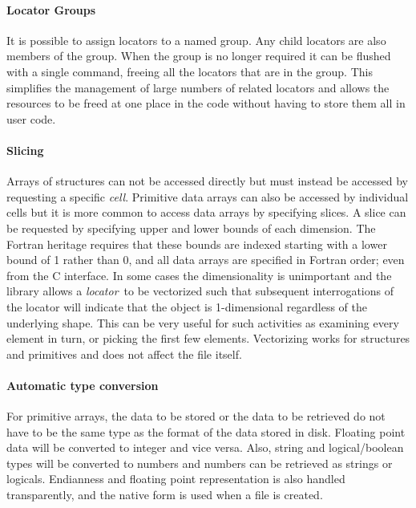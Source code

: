 \documentclass[final,authoryear,5p,times,twocolumn]{elsarticle}
\newcommand{\locator}{\emph{locator}}
\begin{document}
\paragraph{Locator Groups}

It is possible to assign locators to a named group. Any child locators
are also members of the group. When the group is no longer required it
can be flushed with a single command, freeing all the locators that
are in the group. This simplifies the management of large numbers
of related locators and allows the resources to be freed at one place
in the code without having to store them all in user code.

\paragraph{Slicing}

Arrays of structures can not be accessed directly but must instead be
accessed by requesting a specific \emph{cell}. Primitive data arrays
can also be accessed by individual cells but it is more common to
access data arrays by specifying slices. A slice can be requested by
specifying upper and lower bounds of each dimension. The Fortran
heritage requires that these bounds are indexed starting with a lower
bound of 1 rather than 0, and all data arrays are specified in Fortran
order; even from the C interface. In some cases the dimensionality is
unimportant and the library allows a \locator\ to be vectorized such
that subsequent interrogations of the locator will indicate that the
object is 1-dimensional regardless of the underlying shape. This can
be very useful for such activities as examining every element in turn,
or picking the first few elements. Vectorizing works for structures
and primitives and does not affect the file itself.

\paragraph{Automatic type conversion}

For primitive arrays, the data to be stored or the data to be
retrieved do not have to be the same type as the format of the data
stored in disk. Floating point data will be converted to integer and
vice versa. Also, string and logical/boolean types will be converted
to numbers and numbers can be retrieved as strings or
logicals. Endianness and floating point representation is also handled
transparently, and the native form is used when a file is created.
\end{document}
